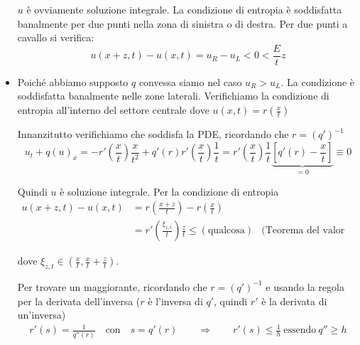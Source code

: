 \begin{dimostrazione}
\begin{itemize}
\begin{figure}[H]
\begin{tikzpicture}[x=0.75pt,y=0.75pt,yscale=-1,xscale=1]
                  \end{tikzpicture}
              \end{figure}
              \FloatBarrier

              $u$ è ovviamente soluzione integrale. La condizione di entropia è soddisfatta banalmente per due punti nella zona di sinistra o di destra. Per due punti a cavallo si verifica:
              \begin{equation*}
                  u(x+z,t) -u(x,t) =u_{R} -u_{L} < 0< \frac{E}{t} z
              \end{equation*}
        \item Poiché abbiamo supposto $q$ convessa siamo nel caso $\displaystyle u_{R}  >u_{L}$. La condizione è soddisfatta banalmente nelle zone laterali. Verifichiamo la condizione di entropia all'interno del settore centrale dove $\displaystyle u(x,t) =r\left(\frac{x}{t}\right)$

              Innanzitutto verifichiamo che soddisfa la PDE, ricordando che $r=(q')^{-1}$
              \begin{equation*}
                  u_{t} +q(u)_{x} =-r'\left(\frac{x}{t}\right)\frac{x}{t^{2}} +q'(r) r'\left(\frac{x}{t}\right)\frac{1}{t} =r'\left(\frac{x}{t}\right)\frac{1}{t}\underbrace{\left[ q'(r) -\frac{x}{t}\right]}_{=0} \equiv 0
              \end{equation*}

              Quindi $u$ è soluzione integrale. Per la condizione di entropia
              \begin{align*}
                  u(x+z,t) -u(x,t) & =r\left(\frac{x+z}{t}\right) -r\left(\frac{x}{t}\right)                     &                                  \\
                                   & =r'\left(\frac{\xi _{z,t}}{t}\right)\frac{z}{t} \leq (\text{qualcosa}) & \text{(Teorema del valor medio)}
              \end{align*}

              dove $\displaystyle \xi _{z,t} \in \left(\frac{x}{t} ,\frac{x}{t} +\frac{z}{t}\right)$.

              Per trovare un maggiorante, ricordando che $\displaystyle r=(q')^{-1}$ e usando la regola per la derivata dell'inversa ($r$ è l'inversa di $q'$, quindi $r'$ è la derivata di un'inversa)
              \begin{gather*}
                  r'(s) =\frac{1}{q''(r)} \quad \text{con} \quad s=q'(r) \qquad \Rightarrow \qquad r'(s) \leq \frac{1}{h} \ \text{essendo} \ q''\geq h
              \end{gather*}


\end{itemize}
\end{dimostrazione}
